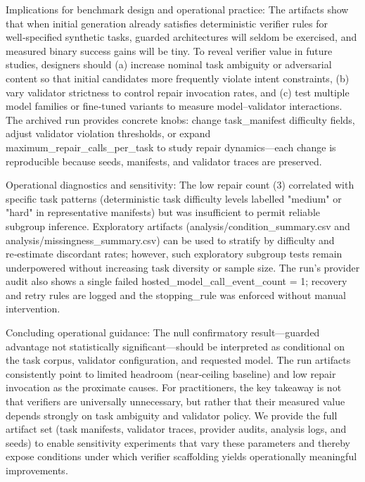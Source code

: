 \documentclass[conference]{IEEEtran}
\begin{document}
Implications for benchmark design and operational practice: The artifacts show that when initial generation already satisfies deterministic verifier rules for well‑specified synthetic tasks, guarded architectures will seldom be exercised, and measured binary success gains will be tiny. To reveal verifier value in future studies, designers should (a) increase nominal task ambiguity or adversarial content so that initial candidates more frequently violate intent constraints, (b) vary validator strictness to control repair invocation rates, and (c) test multiple model families or fine‑tuned variants to measure model--validator interactions. The archived run provides concrete knobs: change task\_manifest difficulty fields, adjust validator violation thresholds, or expand maximum\_repair\_calls\_per\_task to study repair dynamics---each change is reproducible because seeds, manifests, and validator traces are preserved.

Operational diagnostics and sensitivity: The low repair count (3) correlated with specific task patterns (deterministic task difficulty levels labelled "medium" or "hard" in representative manifests) but was insufficient to permit reliable subgroup inference. Exploratory artifacts (analysis/condition\_summary.csv and analysis/missingness\_summary.csv) can be used to stratify by difficulty and re‑estimate discordant rates; however, such exploratory subgroup tests remain underpowered without increasing task diversity or sample size. The run's provider audit also shows a single failed hosted\_model\_call\_event\_count = 1; recovery and retry rules are logged and the stopping\_rule was enforced without manual intervention.

Concluding operational guidance: The null confirmatory result---guarded advantage not statistically significant---should be interpreted as conditional on the task corpus, validator configuration, and requested model. The run artifacts consistently point to limited headroom (near‑ceiling baseline) and low repair invocation as the proximate causes. For practitioners, the key takeaway is not that verifiers are universally unnecessary, but rather that their measured value depends strongly on task ambiguity and validator policy. We provide the full artifact set (task manifests, validator traces, provider audits, analysis logs, and seeds) to enable sensitivity experiments that vary these parameters and thereby expose conditions under which verifier scaffolding yields operationally meaningful improvements.
\end{document}
